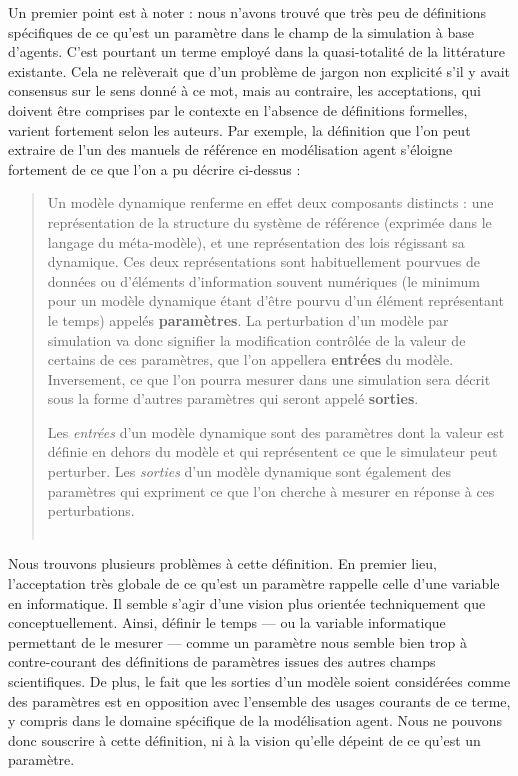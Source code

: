 Un premier point est à noter : nous n'avons trouvé que très peu de définitions spécifiques de ce qu'est un paramètre dans le champ de la simulation à base d'agents.
C'est pourtant un terme employé dans la quasi-totalité de la littérature existante.
Cela ne relèverait que d'un problème de jargon non explicité s'il y avait consensus sur le sens donné à ce mot, mais au contraire, les acceptations, qui doivent être comprises par le contexte en l'absence de définitions formelles, varient fortement selon les auteurs.
Par exemple, la définition que l'on peut extraire de l'un des manuels de référence en modélisation agent \autocite{treuil_modelisation_2008} s'éloigne fortement de ce que l'on a pu décrire ci-dessus :
\begin{quotation}
	\noindent \og
	Un modèle dynamique renferme en effet deux composants distincts : une représentation de la structure du système de référence (exprimée dans le langage du méta-modèle), et une représentation des lois régissant sa dynamique.
	Ces deux représentations sont habituellement pourvues de données ou d'éléments d'information souvent numériques (le minimum pour un modèle dynamique étant d'être pourvu d'un élément représentant le temps) appelés \textbf{paramètres}.
	La \og perturbation\fg{} d'un modèle par simulation va donc signifier la modification contrôlée de la valeur de certains de ces paramètres, que l'on appellera \textbf{entrées} du modèle.
	Inversement, ce que l'on pourra mesurer dans une simulation sera décrit sous la forme d'autres paramètres qui seront appelé \textbf{sorties}.
	
	\noindent Les \textit{entrées} d'un modèle dynamique sont des paramètres dont la valeur est définie en dehors du modèle et qui représentent ce que le simulateur peut perturber.
	Les \textit{sorties} d'un modèle dynamique sont également des paramètres qui expriment ce que l'on cherche à mesurer en réponse à ces perturbations.\fg{}\\
	\mbox{}~ \hfill \autocite[8]{treuil_modelisation_2008}
\end{quotation}
Nous trouvons plusieurs problèmes à cette définition.
En premier lieu, l'acceptation très globale de ce qu'est un paramètre rappelle celle d'une variable en informatique.
Il semble s'agir d'une vision plus orientée techniquement que conceptuellement.
Ainsi, définir le temps --- ou la variable informatique permettant de le mesurer --- comme un paramètre nous semble bien trop à contre-courant des définitions de paramètres issues des autres champs scientifiques.
De plus, le fait que les sorties d'un modèle soient considérées comme des paramètres est en opposition avec l'ensemble des usages courants de ce terme, y compris dans le domaine spécifique de la modélisation agent.
Nous ne pouvons donc souscrire à cette définition, ni à la vision qu'elle dépeint de ce qu'est un paramètre.

